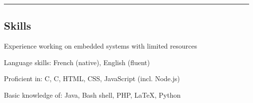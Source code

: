 \documentclass[11pt,a4paper]{article}
\newenvironment{indentsection}[1]%
{\begin{list}{}%
	{\setlength{\leftmargin}{#1}}%
	\item[]%
}
{\end{list}}
\newcommand{\Cplusplus}
{C\nolinebreak[4]\hspace{-.05em}\raisebox{.22ex}{\footnotesize\bf ++}}
\begin{document}
\hrule
\vspace{-0.4em}
\subsection*{Skills}

\begin{indentsection}{\parindent}
\begin{description*}
	\item[Experience working on embedded systems with limited resources]
	\item[Language skills:]
	French (native), English (fluent)
	\item[Proficient in:]
	C, \Cplusplus, HTML, CSS, JavaScript (incl. Node.js)
	\item[Basic knowledge of:]
	Java, Bash shell, PHP, \LaTeX, Python
\end{description*}
\end{indentsection}
\end{document}
